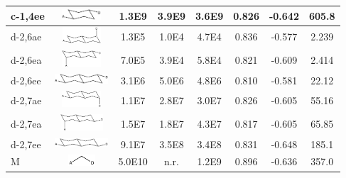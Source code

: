 \begin{table}
\begin{centering}
\begin{tabular}{llccc|ccc}
\hline
 c-1,4ee  &  \includegraphics[height=0.4cm,width=2cm]{Chapters/chap2/Table1-c14ee.pdf}  &                     1.3E9  &                     3.9E9  &          3.6E9  &           0.826  &           -0.642  &      605.8  \\
\hline
 d-2,6ae  &  \includegraphics[height=0.6cm,width=2cm]{Chapters/chap2/Table1-d26ae.pdf}  &                     1.3E5  &                     1.0E4  &          4.7E4  &           0.836  &           -0.577  &    2.239  \\
\hline
d-2,6ea  &  \includegraphics[height=0.6cm,width=2cm]{Chapters/chap2/Table1-d26ea.pdf}  &                     7.0E5  &                     3.9E4  &          5.8E4  &            0.821  &            -0.609  &    2.414  \\
\hline
 d-2,6ee  &  \includegraphics[height=0.4cm,width=2cm]{Chapters/chap2/Table1-d26ee.pdf}  &                     3.1E6  &                     5.0E6  &          4.8E6  &           0.810  &           -0.581  &     22.12  \\
\hline
 d-2,7ae  &  \includegraphics[height=0.6cm,width=2cm]{Chapters/chap2/Table1-d27ae.pdf}  &                     1.1E7  &                     2.8E7  &          3.0E7  &           0.826  &           -0.605  &     55.16   \\
\hline
 d-2,7ea  &  \includegraphics[height=0.6cm,width=2cm]{Chapters/chap2/Table1-d27ea.pdf}  &                     1.5E7  &                     1.8E7  &          4.3E7  &           0.817  &           -0.605  &     65.85  \\
\hline
 d-2,7ee  &  \includegraphics[height=0.4cm,width=2cm]{Chapters/chap2/Table1-d27ee.pdf}  &                     9.1E7  &                     3.5E8  &          3.4E8  &           0.831  &           -0.648  &     185.1  \\
\hline
 M        &  \includegraphics[height=0.4cm,width=2cm]{Chapters/chap2/Table1-M.pdf}      &                    5.0E10  &                      n.r.  &          1.2E9  &              0.896  &      -0.636  &      357.0 \\
\hline
\end{tabular}


\end{centering}
\end{table}
